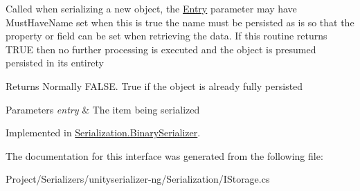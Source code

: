 Called when serializing a new object, the \hyperlink{class_serialization_1_1_entry}{Entry} parameter may have Must\+Have\+Name set when this is true the name must be persisted as is so that the property or field can be set when retrieving the data. If this routine returns T\+R\+UE then no further processing is executed and the object is presumed persisted in its entirety 

\begin{DoxyReturn}{Returns}
Normally F\+A\+L\+SE. True if the object is already fully persisted
\end{DoxyReturn}

\begin{DoxyParams}{Parameters}
{\em entry} & The item being serialized\\
\hline
\end{DoxyParams}


Implemented in \hyperlink{class_serialization_1_1_binary_serializer_aef0fdf4b432dfe09b1bf9c11786dee58}{Serialization.\+Binary\+Serializer}.



The documentation for this interface was generated from the following file\+:\begin{DoxyCompactItemize}
\item 
Project/\+Serializers/unityserializer-\/ng/\+Serialization/I\+Storage.\+cs\end{DoxyCompactItemize}
